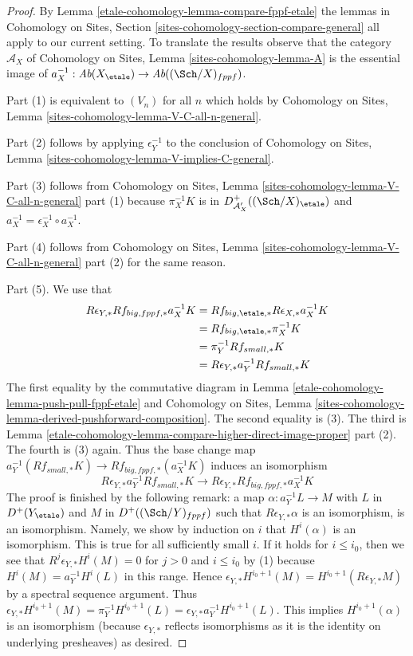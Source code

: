 \begin{proof}
By Lemma \ref{etale-cohomology-lemma-compare-fppf-etale} the lemmas in
Cohomology on Sites, Section \ref{sites-cohomology-section-compare-general}
all apply to our current setting. To translate the results
observe that the category $\mathcal{A}_X$ of
Cohomology on Sites, Lemma \ref{sites-cohomology-lemma-A}
is the essential image of
$a_X^{-1} : \textit{Ab}(X_\etale) \to \textit{Ab}((\Sch/X)_{fppf})$.

\medskip\noindent
Part (1) is equivalent to $(V_n)$ for all $n$ which holds by
Cohomology on Sites, Lemma \ref{sites-cohomology-lemma-V-C-all-n-general}.

\medskip\noindent
Part (2) follows by applying $\epsilon_Y^{-1}$ to the conclusion of
Cohomology on Sites, Lemma \ref{sites-cohomology-lemma-V-implies-C-general}.

\medskip\noindent
Part (3) follows from Cohomology on Sites, Lemma
\ref{sites-cohomology-lemma-V-C-all-n-general} part (1)
because $\pi_X^{-1}K$ is in $D^+_{\mathcal{A}'_X}((\Sch/X)_\etale)$
and $a_X^{-1} = \epsilon_X^{-1} \circ a_X^{-1}$.

\medskip\noindent
Part (4) follows from Cohomology on Sites, Lemma
\ref{sites-cohomology-lemma-V-C-all-n-general} part (2)
for the same reason.

\medskip\noindent
Part (5). We use that
\begin{align*}
R\epsilon_{Y, *}Rf_{big, fppf, *}a_X^{-1}K
& =
Rf_{big, \etale, *}R\epsilon_{X, *}a_X^{-1}K \\
& =
Rf_{big, \etale, *}\pi_X^{-1}K \\
& =
\pi_Y^{-1}Rf_{small, *}K \\
& =
R\epsilon_{Y, *} a_Y^{-1}Rf_{small, *}K
\end{align*}
The first equality by the commutative diagram in
Lemma \ref{etale-cohomology-lemma-push-pull-fppf-etale}
and Cohomology on Sites, Lemma
\ref{sites-cohomology-lemma-derived-pushforward-composition}.
The second equality is (3). The third is
Lemma \ref{etale-cohomology-lemma-compare-higher-direct-image-proper} part (2).
The fourth is (3) again. Thus the base change map
$a_Y^{-1}(Rf_{small, *}K) \to Rf_{big, fppf, *}(a_X^{-1}K)$
induces an isomorphism
$$
R\epsilon_{Y, *}a_Y^{-1}Rf_{small, *}K \to
R\epsilon_{Y, *}Rf_{big, fppf, *}a_X^{-1}K
$$
The proof is finished by the following remark: a map
$\alpha : a_Y^{-1}L \to M$ with $L$ in $D^+(Y_\etale)$
and $M$ in $D^+((\Sch/Y)_{fppf})$ such that $R\epsilon_{Y, *}\alpha$
is an isomorphism, is an isomorphism. Namely,
we show by induction on $i$ that $H^i(\alpha)$ is an isomorphism.
This is true for all sufficiently small $i$.
If it holds for $i \leq i_0$, then we see that
$R^j\epsilon_{Y, *}H^i(M) = 0$ for $j > 0$ and $i \leq i_0$
by (1) because $H^i(M) = a_Y^{-1}H^i(L)$ in this range.
Hence $\epsilon_{Y, *}H^{i_0 + 1}(M) = H^{i_0 + 1}(R\epsilon_{Y, *}M)$
by a spectral sequence argument.
Thus $\epsilon_{Y, *}H^{i_0 + 1}(M) = \pi_Y^{-1}H^{i_0 + 1}(L) =
\epsilon_{Y, *}a_Y^{-1}H^{i_0 + 1}(L)$.
This implies $H^{i_0 + 1}(\alpha)$ is an isomorphism
(because $\epsilon_{Y, *}$ reflects isomorphisms as it is the
identity on underlying presheaves) as desired.
\end{proof}

